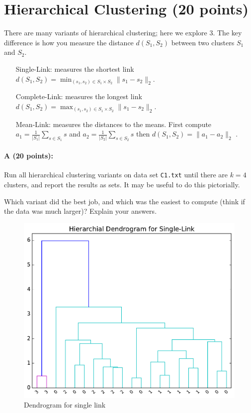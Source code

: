 \documentclass[11pt]{article}
\begin{document}
\section{Hierarchical Clustering (20 points)}

There are many variants of hierarchical clustering; here we explore $3$.  The key difference is how you measure the distance $d(S_1, S_2)$ between two clusters $S_1$ and $S_2$.  
\begin{itemize}
\item[\textsf{Single-Link: }] measures the shortest link $\displaystyle{d(S_1,S_2) = \min_{(s_1,s_2) \in S_1 \times S_2} \|s_1 - s_2\|_2}$. 

\item[\textsf{Complete-Link: }] measures the longest link $\displaystyle{d(S_1,S_2) = \max_{(s_1,s_2) \in S_1 \times S_2} \|s_1 - s_2\|_2}$. 

\item[\textsf{Mean-Link: }] measures the distances to the means.  First compute 
$a_1 = \frac{1}{|S_1|} \sum_{s \in S_1} s$ and 
$a_2 = \frac{1}{|S_2|} \sum_{s \in S_2} s$ then
$\displaystyle{d(S_1, S_2) = \|a_1 - a_2\|_2}$ .
\end{itemize}

\paragraph{A (20 points):}  
Run all hierarchical clustering variants on data set \texttt{C1.txt} until there are $k=4$ clusters, and report the results as sets.  
It may be useful to do this pictorially.  

Which variant did the best job, and which was the easiest to compute (think if the data was much larger)?  
Explain your answers.  

\begin{figure}[H]
\centering
\includegraphics[width=.75\textwidth]{Single-Link_dendro.pdf}
\caption{Dendrogram for single link}
\end{figure}
\end{document}
